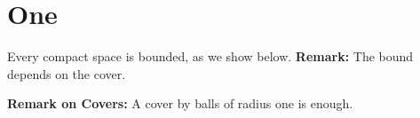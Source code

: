 \documentclass{article}
\begin{document}
\section{One}
Every compact space is bounded, as we show below.
\noindent
{\bf Remark:} The bound depends on the cover.

{\bf Remark on Covers:} A cover by balls of radius one is enough.
\end{document}
